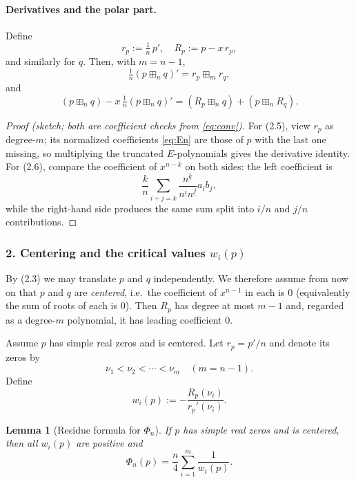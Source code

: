 \documentclass{article}
\newtheorem{lemma}{Lemma}[section]
\begin{document}
\paragraph{Derivatives and the polar part.}
Define
\begin{equation}
  r_p := \tfrac{1}{n}\,p', \quad R_p := p - x\,r_p, \tag{2.4}
\end{equation}
and similarly for $q$. Then, with $m = n-1$,
\begin{equation}
  \tfrac{1}{n}(p \boxplus_n q)' = r_p \boxplus_m r_q, \tag{2.5}
\end{equation}
and
\begin{equation}
  (p \boxplus_n q) - x\,\tfrac{1}{n}(p \boxplus_n q)' = (R_p \boxplus_n q) + (p \boxplus_n R_q). \tag{2.6}
\end{equation}

\begin{proof}[Proof (sketch; both are coefficient checks from \eqref{eq:conv})]
For (2.5), view $r_p$ as degree-$m$; its normalized coefficients \eqref{eq:En} are those of $p$ with the last one missing, so multiplying the truncated $E$-polynomials gives the derivative identity. For (2.6), compare the coefficient of $x^{n-k}$ on both sides: the left coefficient is
\[
  \frac{k}{n}\sum_{i+j=k} \frac{n^{\underline{k}}}{n^{\underline{i}} n^{\underline{j}}} a_i b_j,
\]
while the right-hand side produces the same sum split into $i/n$ and $j/n$ contributions. \qedhere
\end{proof}

\subsubsection*{2. Centering and the critical values $w_i(p)$}

By (2.3) we may translate $p$ and $q$ independently. We therefore assume from now on that $p$ and $q$ are \emph{centered}, i.e.\ the coefficient of $x^{n-1}$ in each is $0$ (equivalently the sum of roots of each is $0$). Then $R_p$ has degree at most $m-1$ and, regarded as a degree-$m$ polynomial, it has leading coefficient $0$.

Assume $p$ has simple real zeros and is centered. Let $r_p = p'/n$ and denote its zeros by
\[
  \nu_1 < \nu_2 < \cdots < \nu_m \quad (m = n-1).
\]
Define
\begin{equation}
  w_i(p) := -\frac{R_p(\nu_i)}{r_p'(\nu_i)}. \tag{2.7}
\end{equation}

\begin{lemma}[Residue formula for $\Phi_n$]\label{lem:residue}
If $p$ has simple real zeros and is centered, then all $w_i(p)$ are positive and
\begin{equation}
  \Phi_n(p) = \frac{n}{4} \sum_{i=1}^{m} \frac{1}{w_i(p)}. \tag{2.8}
\end{equation}
\end{lemma}
\end{document}
